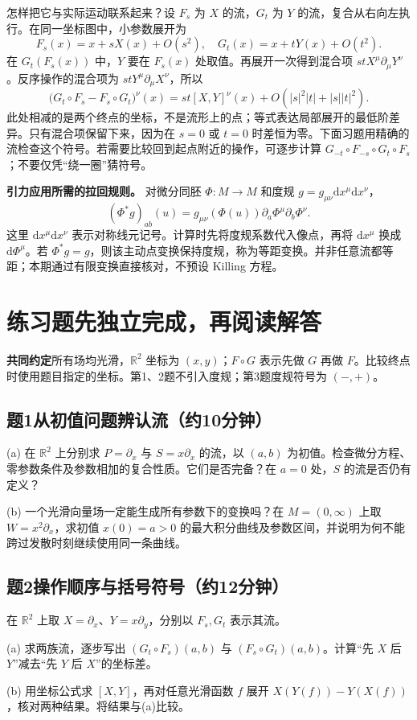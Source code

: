 \documentclass[11pt,a4paper]{article}
\newcommand{\D}{\mathrm d}
\newcommand{\head}[1]{\section*{\color{teal}#1}}
\begin{document}
怎样把它与实际运动联系起来？设 $F_s$ 为 $X$ 的流，$G_t$ 为 $Y$ 的流，复合从右向左执行。在同一坐标图中，小参数展开为
\[
 F_s(x)=x+sX(x)+O(s^2),\quad G_t(x)=x+tY(x)+O(t^2).
\]
在 $G_t(F_s(x))$ 中，$Y$ 要在 $F_s(x)$ 处取值。再展开一次得到混合项 $stX^\mu\partial_\mu Y^\nu$。反序操作的混合项为 $stY^\mu\partial_\mu X^\nu$，所以
\[
 \bigl(G_t\circ F_s-F_s\circ G_t\bigr)^\nu(x)
 =st[X,Y]^\nu(x)+O(|s|^2|t|+|s||t|^2).
\]
此处相减的是两个终点的坐标，不是流形上的点；等式表达局部展开的最低阶差异。只有混合项保留下来，因为在 $s=0$ 或 $t=0$ 时差恒为零。下面习题用精确的流检查这个符号。若需要比较回到起点附近的操作，可逐步计算 $G_{-t}\circ F_{-s}\circ G_t\circ F_s$；不要仅凭“绕一圈”猜符号。

\textbf{引力应用所需的拉回规则。} 对微分同胚 $\Phi:M\to M$ 和度规 $g=g_{\mu\nu}\D x^\mu\D x^\nu$，
\[
 (\Phi^*g)_{ab}(u)
 =g_{\mu\nu}(\Phi(u))\partial_a\Phi^\mu\partial_b\Phi^\nu.
\]
这里 $\D x^\mu\D x^\nu$ 表示对称线元记号。计算时先将度规系数代入像点，再将 $\D x^\mu$ 换成 $\D\Phi^\mu$。若 $\Phi^*g=g$，则该主动点变换保持度规，称为等距变换。并非任意流都等距；本期通过有限变换直接核对，不预设 Killing 方程。
\newpage
\head{练习题\quad 先独立完成，再阅读解答}
\textbf{共同约定}\quad 所有场均光滑，$\mathbb R^2$ 坐标为 $(x,y)$；$F\circ G$ 表示先做 $G$ 再做 $F$。比较终点时使用题目指定的坐标。第1、2题不引入度规；第3题度规符号为 $(-,+)$。

\subsection*{题1\quad 从初值问题辨认流（约10分钟）}
(a) 在 $\mathbb R^2$ 上分别求 $P=\partial_x$ 与 $S=x\partial_x$ 的流，以 $(a,b)$ 为初值。检查微分方程、零参数条件及参数相加的复合性质。它们是否完备？在 $a=0$ 处，$S$ 的流是否仍有定义？

(b) 一个光滑向量场一定能生成所有参数下的变换吗？在 $M=(0,\infty)$ 上取 $W=x^2\partial_x$，求初值 $x(0)=a>0$ 的最大积分曲线及参数区间，并说明为何不能跨过发散时刻继续使用同一条曲线。

\subsection*{题2\quad 操作顺序与括号符号（约12分钟）}
在 $\mathbb R^2$ 上取 $X=\partial_x$、$Y=x\partial_y$，分别以 $F_s,G_t$ 表示其流。

(a) 求两族流，逐步写出 $(G_t\circ F_s)(a,b)$ 与 $(F_s\circ G_t)(a,b)$。计算“先 $X$ 后 $Y$”减去“先 $Y$ 后 $X$”的坐标差。

(b) 用坐标公式求 $[X,Y]$，再对任意光滑函数 $f$ 展开 $X(Y(f))-Y(X(f))$，核对两种结果。将结果与(a)比较。
\end{document}
